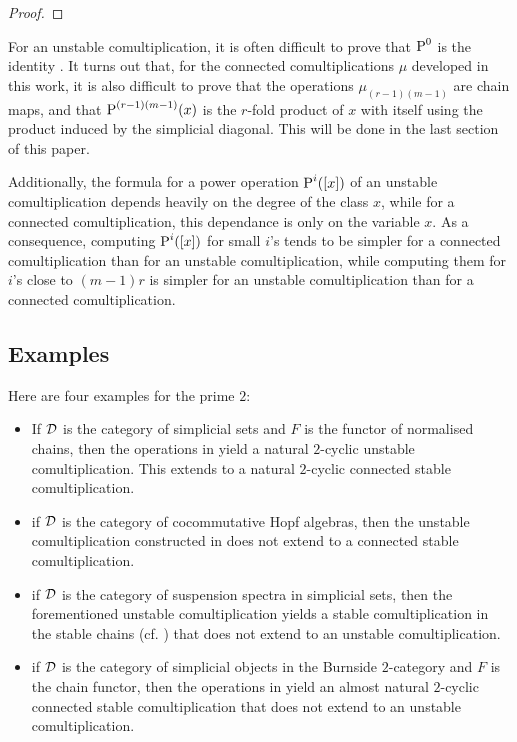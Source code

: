 \begin{proof}
\end{proof}

For an unstable comultiplication, it is often difficult to prove that $\operatorname{P}^0$ is the identity \cite{may1970general}. It turns out that, for the connected comultiplications $\mu$ developed in this work, it is also difficult to prove that the operations $\mu_{(r-1)(m-1)}$ are chain maps, and that $\operatorname{P}^{(r-1)(m-1)}(x)$ is the $r$-fold product of $x$ with itself using the product induced by the simplicial diagonal. This will be done in the last section of this paper.

Additionally, the formula for a power operation $\operatorname{P}^i([x])$ of an unstable comultiplication depends heavily on the degree of the class $x$, while for a connected comultiplication, this dependance is only on the variable $x$. As a consequence, computing $\operatorname{P}^i([x])$ for small $i$'s tends to be simpler for a connected comultiplication than for an unstable comultiplication, while computing them for $i$'s close to $(m-1)r$ is simpler for an unstable comultiplication than for a connected comultiplication.

\subsection{Examples}

Here are four examples for the prime $2$:
\begin{itemize}
	\item If $\mathcal{D}$ is the category of simplicial sets and $F$ is the functor of normalised chains, then the operations in \cite{steenrod1947products} yield a natural $2$-cyclic unstable comultiplication. This extends to a natural $2$-cyclic connected stable comultiplication.
	\item if $\mathcal{D}$ is the category of cocommutative Hopf algebras, then the unstable comultiplication constructed in \cite{may1970general} does not extend to a connected stable comultiplication.
	\item if $\mathcal{D}$ is the category of suspension spectra in simplicial sets, then the forementioned unstable comultiplication yields a stable comultiplication in the stable chains (cf. \cite{Gill2020}) that does not extend to an unstable comultiplication.
	\item if $\mathcal{D}$ is the category of simplicial objects in the Burnside $2$-category and $F$ is the chain functor, then the operations in \cite{cantero-moran2020khovanov} yield an almost natural $2$-cyclic connected stable comultiplication that does not extend to an unstable comultiplication.
\end{itemize}

